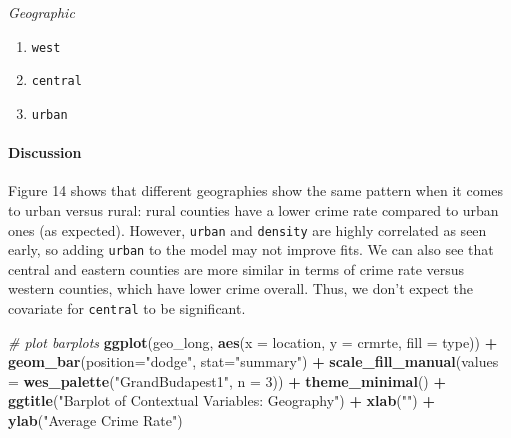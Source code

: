 \documentclass[]{article}
\newenvironment{Shaded}{\begin{snugshade}}{\end{snugshade}}
\newcommand{\CommentTok}[1]{\textcolor[rgb]{0.56,0.35,0.01}{\textit{#1}}}
\newcommand{\DataTypeTok}[1]{\textcolor[rgb]{0.13,0.29,0.53}{#1}}
\newcommand{\DecValTok}[1]{\textcolor[rgb]{0.00,0.00,0.81}{#1}}
\newcommand{\KeywordTok}[1]{\textcolor[rgb]{0.13,0.29,0.53}{\textbf{#1}}}
\newcommand{\NormalTok}[1]{#1}
\newcommand{\OperatorTok}[1]{\textcolor[rgb]{0.81,0.36,0.00}{\textbf{#1}}}
\newcommand{\StringTok}[1]{\textcolor[rgb]{0.31,0.60,0.02}{#1}}
\let\oldparagraph\paragraph
\renewcommand{\paragraph}[1]{\oldparagraph{#1}\mbox{}}
\begin{document}
\emph{Geographic}

\begin{enumerate}
\def\labelenumi{(\arabic{enumi})}
\setcounter{enumi}{8}
\item
  \texttt{west}
\item
  \texttt{central}
\item
  \texttt{urban}
\end{enumerate}

\hypertarget{discussion-3}{%
\paragraph{Discussion}\label{discussion-3}}

Figure 14 shows that different geographies show the same pattern when it
comes to urban versus rural: rural counties have a lower crime rate
compared to urban ones (as expected). However, \texttt{urban} and
\texttt{density} are highly correlated as seen early, so adding
\texttt{urban} to the model may not improve fits. We can also see that
central and eastern counties are more similar in terms of crime rate
versus western counties, which have lower crime overall. Thus, we don't
expect the covariate for \texttt{central} to be significant.

\begin{Shaded}
\begin{Highlighting}[]
\CommentTok{# plot barplots}
\KeywordTok{ggplot}\NormalTok{(geo_long, }\KeywordTok{aes}\NormalTok{(}\DataTypeTok{x =}\NormalTok{ location, }\DataTypeTok{y =}\NormalTok{ crmrte, }\DataTypeTok{fill =}\NormalTok{ type)) }\OperatorTok{+}
\StringTok{  }\KeywordTok{geom_bar}\NormalTok{(}\DataTypeTok{position=}\StringTok{"dodge"}\NormalTok{, }\DataTypeTok{stat=}\StringTok{"summary"}\NormalTok{) }\OperatorTok{+}
\StringTok{  }\KeywordTok{scale_fill_manual}\NormalTok{(}\DataTypeTok{values =} \KeywordTok{wes_palette}\NormalTok{(}\StringTok{"GrandBudapest1"}\NormalTok{, }\DataTypeTok{n =} \DecValTok{3}\NormalTok{)) }\OperatorTok{+}\StringTok{ }
\StringTok{  }\KeywordTok{theme_minimal}\NormalTok{() }\OperatorTok{+}
\StringTok{  }\KeywordTok{ggtitle}\NormalTok{(}\StringTok{"Barplot of Contextual Variables: Geography"}\NormalTok{) }\OperatorTok{+}
\StringTok{  }\KeywordTok{xlab}\NormalTok{(}\StringTok{""}\NormalTok{) }\OperatorTok{+}
\StringTok{  }\KeywordTok{ylab}\NormalTok{(}\StringTok{"Average Crime Rate"}\NormalTok{)}
\end{Highlighting}
\end{Shaded}
\end{document}
